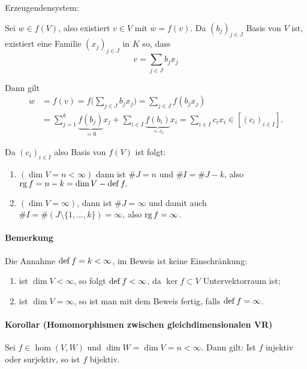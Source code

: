         Erzeugendensystem:
        \begin{addmargin}[25pt]{0pt}
	Sei $w\in f(V)$, also existiert $v\in V$ mit $w = f(v)$. Da $(b_j)_{j\in J}$ Basis von $V$ ist, existiert eine Familie $(x_j)_{j\in J}$ in $K$ so, dass 
	\begin{equation*}
		v = \sum_{j\in J} b_jx_j
	\end{equation*}
	
	Dann gilt
	\begin{align*}
		w &= f(v) = f\Big(\sum_{j\in J} b_jx_j\Big) = \sum_{j\in J}f(b_jx_j)\\
		  &= \sum_{j=1}^{k}\underbrace{f(b_j)}_{=0}x_j + \sum_{i\in I}\underbrace{f(b_i)}_{=c_i}x_i = \sum_{i\in I}c_ix_i\in[(c_i)_{i\in I}].
	\end{align*}
        \end{addmargin}
        
	Da $(c_i)_{i\in I}$ also Basis von $f(V)$ ist folgt:
	\begin{enumerate}[1.{ Fall:}]
		\item $(\dim V = n<\infty)$ dann ist $\# J = n$ und $\# I = \# J-k$, also $\operatorname{rg} f = n-k = \dim V - \operatorname{def} f.$
		\item $(\dim V = \infty)$, dann ist $\# J = \infty $ und damit auch $\#I =\#(J\setminus \{{1,...,k\}})=\infty $, also $\operatorname{rg} f= \infty$.
	\end{enumerate}
	
\paragraph{Bemerkung}
	Die Annahme $\operatorname{def} f = k<\infty$, im Beweis ist keine Einschränkung:
	\begin{enumerate}
		\item ist $\dim V < \infty$, so folgt $\operatorname{def} f<\infty$, da $\ker f\subset V$ Untervektorraum ist;			
		\item ist $\dim V = \infty$, so ist man mit dem Beweis fertig, falls $\operatorname{def} f = \infty$.
	\end{enumerate}
			
\paragraph{Korollar (Homomorphismen zwischen gleichdimensionalen VR)} 
	\begin{Korollar}
		Sei $f\in \hom(V,W)$ und $\dim W = \dim V = n<\infty$.
	Dann gilt: Ist $f$ injektiv oder surjektiv, so ist $f$ bijektiv.
	\end{Korollar}
	
